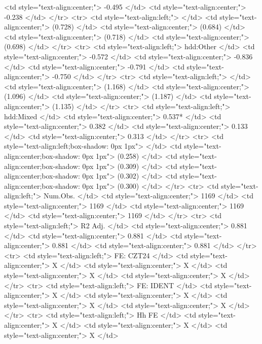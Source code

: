    <td style="text-align:center;"> -0.495 </td>
   <td style="text-align:center;"> -0.238 </td>
  </tr>
  <tr>
   <td style="text-align:left;">  </td>
   <td style="text-align:center;"> (0.728) </td>
   <td style="text-align:center;"> (0.684) </td>
   <td style="text-align:center;"> (0.718) </td>
   <td style="text-align:center;"> (0.698) </td>
  </tr>
  <tr>
   <td style="text-align:left;"> hdd:Other </td>
   <td style="text-align:center;"> -0.572 </td>
   <td style="text-align:center;"> -0.836 </td>
   <td style="text-align:center;"> -0.791 </td>
   <td style="text-align:center;"> -0.750 </td>
  </tr>
  <tr>
   <td style="text-align:left;">  </td>
   <td style="text-align:center;"> (1.168) </td>
   <td style="text-align:center;"> (1.096) </td>
   <td style="text-align:center;"> (1.187) </td>
   <td style="text-align:center;"> (1.135) </td>
  </tr>
  <tr>
   <td style="text-align:left;"> hdd:Mixed </td>
   <td style="text-align:center;"> 0.537* </td>
   <td style="text-align:center;"> 0.382 </td>
   <td style="text-align:center;"> 0.133 </td>
   <td style="text-align:center;"> 0.313 </td>
  </tr>
  <tr>
   <td style="text-align:left;box-shadow: 0px 1px">  </td>
   <td style="text-align:center;box-shadow: 0px 1px"> (0.258) </td>
   <td style="text-align:center;box-shadow: 0px 1px"> (0.309) </td>
   <td style="text-align:center;box-shadow: 0px 1px"> (0.302) </td>
   <td style="text-align:center;box-shadow: 0px 1px"> (0.300) </td>
  </tr>
  <tr>
   <td style="text-align:left;"> Num.Obs. </td>
   <td style="text-align:center;"> 1169 </td>
   <td style="text-align:center;"> 1169 </td>
   <td style="text-align:center;"> 1169 </td>
   <td style="text-align:center;"> 1169 </td>
  </tr>
  <tr>
   <td style="text-align:left;"> R2 Adj. </td>
   <td style="text-align:center;"> 0.881 </td>
   <td style="text-align:center;"> 0.881 </td>
   <td style="text-align:center;"> 0.881 </td>
   <td style="text-align:center;"> 0.881 </td>
  </tr>
  <tr>
   <td style="text-align:left;"> FE: CZT24 </td>
   <td style="text-align:center;"> X </td>
   <td style="text-align:center;"> X </td>
   <td style="text-align:center;"> X </td>
   <td style="text-align:center;"> X </td>
  </tr>
  <tr>
   <td style="text-align:left;"> FE: IDENT </td>
   <td style="text-align:center;"> X </td>
   <td style="text-align:center;"> X </td>
   <td style="text-align:center;"> X </td>
   <td style="text-align:center;"> X </td>
  </tr>
  <tr>
   <td style="text-align:left;"> Hh FE </td>
   <td style="text-align:center;"> X </td>
   <td style="text-align:center;"> X </td>
   <td style="text-align:center;"> X </td>
